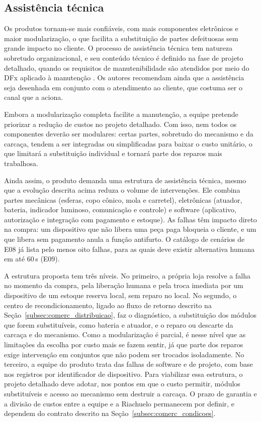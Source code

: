 \subsection{Assistência técnica}
\label{subsec:comerc_assistencia}

Os produtos tornam-se mais confiáveis, com mais componentes eletrônicos e maior modularização, o que facilita a substituição de partes defeituosas sem grande impacto no cliente. O processo de assistência técnica tem natureza sobretudo organizacional, e seu conteúdo técnico é definido na fase de projeto detalhado, quando os requisitos de manutenibilidade são atendidos por meio do DFx aplicado à manutenção \cite{rozenfeld2006gestao}. Os autores recomendam ainda que a assistência seja desenhada em conjunto com o atendimento ao cliente, que costuma ser o canal que a aciona.

Embora a modularização completa facilite a manutenção, a equipe pretende priorizar a redução de custos no projeto detalhado. Com isso, nem todos os componentes deverão ser modulares: certas partes, sobretudo do mecanismo e da carcaça, tendem a ser integradas ou simplificadas para baixar o custo unitário, o que limitará a substituição individual e tornará parte dos reparos mais trabalhosa.

Ainda assim, o produto demanda uma estrutura de assistência técnica, mesmo que a evolução descrita acima reduza o volume de intervenções. Ele combina partes mecânicas (esferas, copo cônico, mola e carretel), eletrônicas (atuador, bateria, indicador luminoso, comunicação e controle) e software (aplicativo, autorização e integração com pagamento e estoque). As falhas têm impacto direto na compra: um dispositivo que não libera uma peça paga bloqueia o cliente, e um que libera sem pagamento anula a função antifurto. O catálogo de cenários de E08 já lista pelo menos oito falhas, para as quais deve existir alternativa humana em até 60\,s (E09).

A estrutura proposta tem três níveis. No primeiro, a própria loja resolve a falha no momento da compra, pela liberação humana e pela troca imediata por um dispositivo de um estoque reserva local, sem reparo no local. No segundo, o centro de recondicionamento, ligado ao fluxo de retorno descrito na Seção~\ref{subsec:comerc_distribuicao}, faz o diagnóstico, a substituição dos módulos que forem substituíveis, como bateria e atuador, e o reparo ou descarte da carcaça e do mecanismo. Como a modularização é parcial, é nesse nível que as limitações da escolha por custo mais se fazem sentir, já que parte dos reparos exige intervenção em conjuntos que não podem ser trocados isoladamente. No terceiro, a equipe do produto trata das falhas de software e de projeto, com base nos registros por identificador de dispositivo. Para viabilizar essa estrutura, o projeto detalhado deve adotar, nos pontos em que o custo permitir, módulos substituíveis e acesso ao mecanismo sem destruir a carcaça. O prazo de garantia e a divisão de custos entre a equipe e a Riachuelo permanecem por definir, e dependem do contrato descrito na Seção~\ref{subsec:comerc_condicoes}.